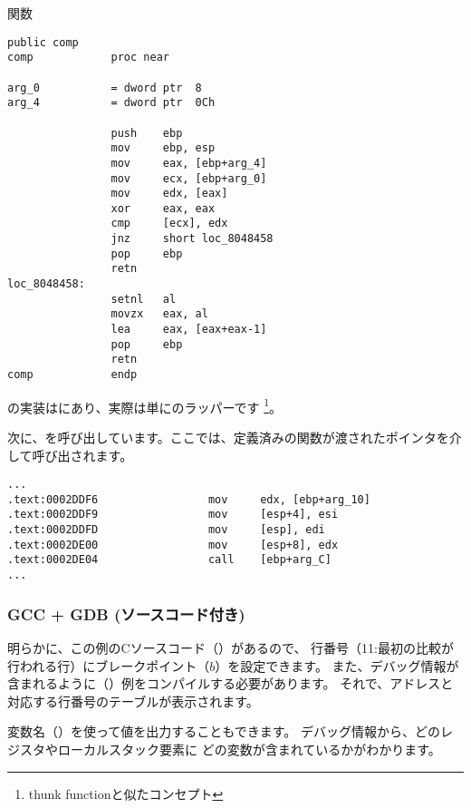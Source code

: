 \comp 関数

\begin{lstlisting}[style=customasmx86]
                public comp
comp            proc near

arg_0           = dword ptr  8
arg_4           = dword ptr  0Ch

                push    ebp
                mov     ebp, esp
                mov     eax, [ebp+arg_4]
                mov     ecx, [ebp+arg_0]
                mov     edx, [eax]
                xor     eax, eax
                cmp     [ecx], edx
                jnz     short loc_8048458
                pop     ebp
                retn
loc_8048458:
                setnl   al
                movzx   eax, al
                lea     eax, [eax+eax-1]
                pop     ebp
                retn
comp            endp
\end{lstlisting}


\qsort の実装はにあり、実際は単にのラッパーです
\footnote{\gls{thunk function}と似たコンセプト}。

次に、を呼び出しています。ここでは、定義済みの関数が渡されたポインタを介して呼び出されます。

\begin{lstlisting}[caption=(file libc.so.6{,} glibc version---2.10.1),style=customasmx86]
...
.text:0002DDF6                 mov     edx, [ebp+arg_10]
.text:0002DDF9                 mov     [esp+4], esi
.text:0002DDFD                 mov     [esp], edi
.text:0002DE00                 mov     [esp+8], edx
.text:0002DE04                 call    [ebp+arg_C]
...
\end{lstlisting}

\subsubsection{GCC + GDB (ソースコード付き)}

明らかに、この例のCソースコード（）があるので、
行番号（11:最初の比較が行われる行）にブレークポイント（$b$）を設定できます。 
また、デバッグ情報が含まれるように（）例をコンパイルする必要があります。
それで、アドレスと対応する行番号のテーブルが表示されます。

変数名（）を使って値を出力することもできます。
デバッグ情報から、どのレジスタやローカルスタック要素に
どの変数が含まれているかがわかります。

